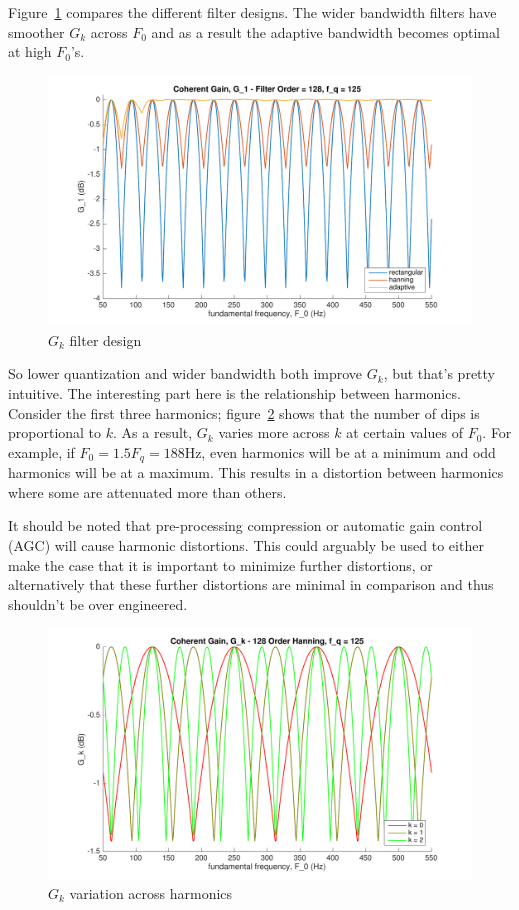 \documentclass [11pt, proquest,oneside] {ganter_thesis}[2015/03/03]
\begin{document}
Figure~\ref{fig:g_k_3} compares the different filter designs.  The wider bandwidth filters have smoother $G_k$ across $F_0$ and as a result the adaptive bandwidth becomes optimal at high $F_0$'s.

\begin{figure}[!ht]
  \centering
    \includegraphics[width=.8\textwidth]{g_k_3}   
    \caption{$G_k$ filter design}\label{fig:g_k_3}
\end{figure}

So lower quantization and wider bandwidth both improve $G_k$, but that's pretty intuitive.  The interesting part here is the relationship between harmonics.  Consider the first three harmonics;  figure~\ref{fig:g_k_4} shows that the number of dips is proportional to $k$.  As a result, $G_k$ varies more across $k$ at certain values of $F_0$.  For example, if $F_0 = 1.5F_q = 188$Hz, even harmonics will be at a minimum and odd harmonics will be at a maximum.  This results in a distortion between harmonics where some are attenuated more than others.

It should be noted that pre-processing compression or automatic gain control (AGC) will cause harmonic distortions.  This could arguably be used to either make the case that it is important to minimize further distortions, or alternatively that these further distortions are minimal in comparison and thus shouldn't be over engineered.

\begin{figure}[!ht]
  \centering
    \includegraphics[width=1\textwidth]{g_k_4}   
    \caption{$G_k$ variation across harmonics}\label{fig:g_k_4}
\end{figure}
\end{document}
